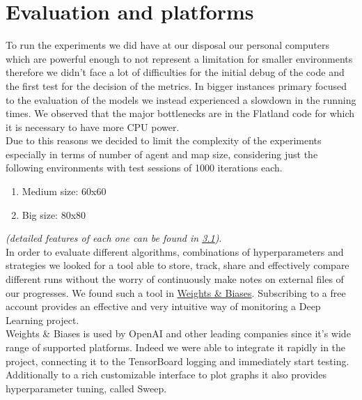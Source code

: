\section{Evaluation and platforms}
\label{sec:evaluation}
To run the experiments we did have at our disposal our personal computers which are powerful enough to not represent a limitation for smaller environments therefore we didn't face a lot of difficulties for the initial debug of the code and the first test for the decision of the metrics. In bigger instances primary focused to the evaluation of the models we instead experienced a slowdown in the running times. We observed that the major bottlenecks are in the Flatland code for which it is necessary to have more CPU power.\\
Due to this reasons we decided to limit the complexity of the experiments especially in terms of number of agent and map size, considering just the following environments with test sessions of 1000 iterations each.
\begin{enumerate}
	\item Medium size: 60x60
	\item Big size: 80x80
\end{enumerate}
\textit{(detailed features of each one can be found in \hyperref[sec:ourParameters]{3.1})}.\\
In order to evaluate different algorithms, combinations of hyperparameters and strategies we looked for a tool able to store, track, share and effectively compare different runs without the worry of continuously make notes on external files of our progresses.
We found such a tool in \href{https://www.wandb.com/}{Weights \& Biases}.
Subscribing to a free account provides an effective and very intuitive way of monitoring a Deep Learning project.\\
Weights \& Biases is used by OpenAI and other leading companies since it's wide range of supported platforms. Indeed we were able to integrate it rapidly in the project, connecting it to the TensorBoard logging and immediately start testing.\\
Additionally to a rich customizable interface to plot graphs it also provides hyperparameter tuning, called Sweep.
